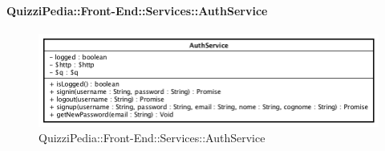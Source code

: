 \paragraph{QuizziPedia::Front-End::Services::AuthService}
\begin{figure}[ht]
	\centering
	\includegraphics[scale=0.60]{UML/Classi/Front-End/QuizziPedia_Front-end_Services_AuthService.png}
	\caption{QuizziPedia::Front-End::Services::AuthService}
\end{figure} \FloatBarrier

